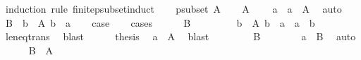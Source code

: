 \begin{isabellebody}
%
\isadelimproof
%
\endisadelimproof
%
\isatagproof
{}\isamarkupfalse%
\ {\isacharparenleft}{\kern0pt}induction\ rule{\isacharcolon}{\kern0pt}\ finite{\isacharunderscore}{\kern0pt}psubset{\isacharunderscore}{\kern0pt}induct{\isacharparenright}{\kern0pt}\isanewline
\ \ \isamarkupfalse%
\ {\isacharparenleft}{\kern0pt}psubset\ A{\isacharparenright}{\kern0pt}\isanewline
\ \ \isamarkupfalse%
\ {\isacartoucheopen}A\ {\isasymnoteq}\ {\isacharbraceleft}{\kern0pt}{\isacharbraceright}{\kern0pt}{\isacartoucheclose}\ \isamarkupfalse%
\ a\ \ {\isachardoublequoteopen}a\ {\isasymin}\ A{\isachardoublequoteclose}\ \isamarkupfalse%
\ auto\isanewline
\ \ \isamarkupfalse%
\ {\isacharquery}{\kern0pt}B\ {\isacharequal}{\kern0pt}\ {\isachardoublequoteopen}{\isacharbraceleft}{\kern0pt}b\ {\isasymin}\ A{\isachardot}{\kern0pt}\ b\ {\isacharless}{\kern0pt}\ a{\isacharbraceright}{\kern0pt}{\isachardoublequoteclose}\isanewline
\ \ \isamarkupfalse%
\ {\isacharquery}{\kern0pt}case\isanewline
\ \ \isamarkupfalse%
\ cases\isanewline
\ \ \ \ \isamarkupfalse%
\ {\isachardoublequoteopen}{\isacharquery}{\kern0pt}B\ {\isacharequal}{\kern0pt}\ {\isacharbraceleft}{\kern0pt}{\isacharbraceright}{\kern0pt}{\isachardoublequoteclose}\isanewline
\ \ \ \ \isamarkupfalse%
\ {\isachardoublequoteopen}{\isasymforall}\ b\ {\isasymin}\ A{\isachardot}{\kern0pt}\ b\ {\isasymle}\ a\ {\isasymlongrightarrow}\ a\ {\isacharequal}{\kern0pt}\ b{\isachardoublequoteclose}\ \isamarkupfalse%
\ le{\isacharunderscore}{\kern0pt}neq{\isacharunderscore}{\kern0pt}trans\ \isamarkupfalse%
\ blast\isanewline
\ \ \ \ \isamarkupfalse%
\ {\isacharquery}{\kern0pt}thesis\ \isamarkupfalse%
\ {\isacartoucheopen}a\ {\isasymin}\ A{\isacartoucheclose}\ \isamarkupfalse%
\ blast\isanewline
\ \ \isamarkupfalse%
\isanewline
\ \ \ \ \isamarkupfalse%
\ {\isachardoublequoteopen}{\isacharquery}{\kern0pt}B\ {\isasymnoteq}\ {\isacharbraceleft}{\kern0pt}{\isacharbraceright}{\kern0pt}{\isachardoublequoteclose}\isanewline
\ \ \ \ \isamarkupfalse%
\ {\isachardoublequoteopen}a\ {\isasymnotin}\ {\isacharquery}{\kern0pt}B{\isachardoublequoteclose}\ \isamarkupfalse%
\ auto\isanewline
\ \ \ \ \isamarkupfalse%
\ {\isachardoublequoteopen}{\isacharquery}{\kern0pt}B\ {\isasymsubset}\ A{\isachardoublequoteclose}\ \isamarkupfalse%

\end{isabellebody}
